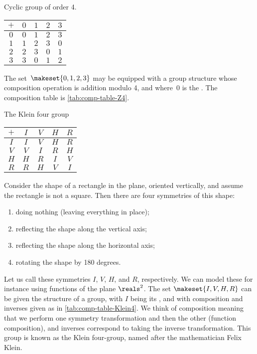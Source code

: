 \begin{margintable}
    \caption{Cyclic group of order 4.}
    \label{tab:comp-table-Z4}
    \centering
    \begin{tabular}{c|cccc}
        $+$ & $0$ & $1$ & $2$ & $3$ \\
        \hline
        $0$ & $0$ & $1$ & $2$ & $3$ \\
        $1$ & $1$ & $2$ & $3$ & $0$ \\
        $2$ & $2$ & $3$ & $0$ & $1$ \\
        $3$ & $3$ & $0$ & $1$ & $2$
    \end{tabular}
\end{margintable}

\begin{example}
    \label{exa:grp-Z4}
    The set~$\makeset{0, 1, 2, 3 }$ may be equipped with a group structure whose composition operation is addition modulo 4, and where~$0$ is the .
    The composition table is \cref{tab:comp-table-Z4}.
\end{example}

\begin{margintable}
    \caption{The Klein four group}
    \label{tab:comp-table-Klein4}
    \centering
    \begin{tabular}{c|cccc}
        $+$ & $I$ & $V$ & $H$ & $R$ \\
        \hline
        $I$ & $I$ & $V$ & $H$ & $R$ \\
        $V$ & $V$ & $I$ & $R$ & $H$ \\
        $H$ & $H$ & $R$ & $I$ & $V$ \\
        $R$ & $R$ & $H$ & $V$ & $I$
    \end{tabular}
\end{margintable}
\begin{example}
    \label{exa:grp-Klein4}
    Consider the shape of a rectangle in the plane, oriented vertically, and assume the rectangle is not a square.
    Then there are four symmetries of this shape:
    \begin{enumerate}
        \item doing nothing (leaving everything in place);
        \item reflecting the shape along the vertical axis;
        \item reflecting the shape along the horizontal axis;
        \item rotating the shape by 180 degrees.
    \end{enumerate}
    Let us call these symmetries $I$, $V$, $H$, and $R$, respectively.
    We can model these for instance using  functions of the plane $\reals^2$.
    The set $\makeset{I, V, H, R}$ can be given the structure of a group, with $I$ being its , and with composition and inverses given as in \cref{tab:comp-table-Klein4}.
    We think of composition meaning that we perform one symmetry transformation and then the other (function composition), and inverses correspond to taking the inverse transformation.
    This group is known as the Klein four-group, named after the mathematician Felix Klein.
\end{example}

